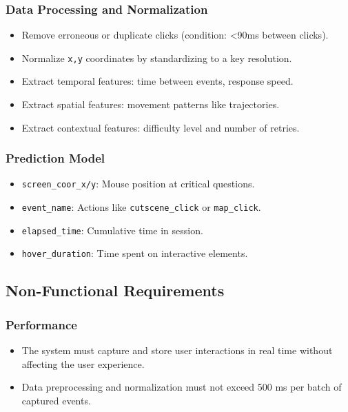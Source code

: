 \documentclass{article}
\newcommand{\reqnum}[1]{\textbf{\underline{RF-#1}}}
\newcommand{\reqnumNF}[1]{\textbf{\underline{RNF-#1}}}
\begin{document}
\subsubsection{Data Processing and Normalization}
\begin{itemize}
    \item[\reqnum{006}] Remove erroneous or duplicate clicks (condition: <90ms between clicks).
    \item[\reqnum{007}] Normalize \texttt{x,y} coordinates by standardizing to a key resolution.
    \item[\reqnum{008}] Extract temporal features: time between events, response speed.
    \item[\reqnum{009}] Extract spatial features: movement patterns like trajectories.
    \item[\reqnum{010}] Extract contextual features: difficulty level and number of retries.
\end{itemize}

\subsubsection{Prediction Model}
\begin{itemize}
    \item[\reqnum{011}] \texttt{screen\_coor\_x/y}: Mouse position at critical questions.
    \item[\reqnum{012}] \texttt{event\_name}: Actions like \texttt{cutscene\_click} or \texttt{map\_click}.
    \item[\reqnum{013}] \texttt{elapsed\_time}: Cumulative time in session.
    \item[\reqnum{014}] \texttt{hover\_duration}: Time spent on interactive elements.
\end{itemize}

\subsection{Non-Functional Requirements}
\subsubsection{Performance}
\begin{itemize}
    \item[\reqnumNF{001}] The system must capture and store user interactions in real time without affecting the user experience.
    \item[\reqnumNF{002}] Data preprocessing and normalization must not exceed 500 ms per batch of captured events.
\end{itemize}
\end{document}
